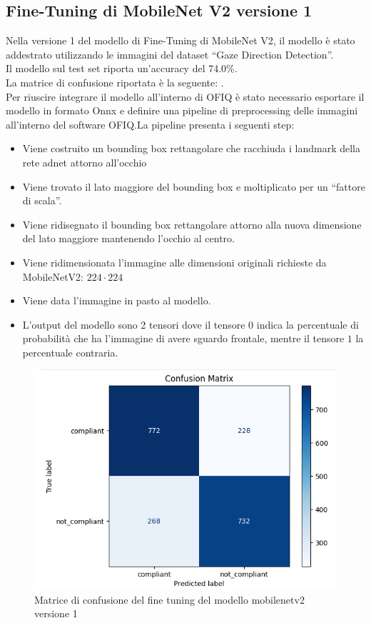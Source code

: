 \documentclass[12pt,a4paper,openright,twoside]{book}
\begin{document}
\subsection{Fine-Tuning di MobileNet V2 versione 1}
\label{chap:mobilenetv2_ft_v1}
Nella versione 1 del modello di Fine-Tuning di MobileNet V2, il modello è stato addestrato utilizzando le immagini del dataset ``Gaze Direction Detection''. \\
Il modello sul test set riporta un'accuracy del 74.0\%. \\
La matrice di confusione riportata è la seguente: . \\
Per riuscire integrare il modello all'interno di OFIQ è stato necessario esportare il modello in formato Onnx e definire una pipeline di preprocessing delle immagini all'interno del software OFIQ.La pipeline presenta i seguenti step: \begin{itemize}
    \item Viene costruito un bounding box rettangolare che racchiuda i landmark della rete adnet attorno all'occhio
    \item Viene trovato il lato maggiore del bounding box e moltiplicato per un ``fattore di scala''.
    \item Viene ridisegnato il bounding box rettangolare attorno alla nuova dimensione del lato maggiore mantenendo l'occhio al centro.
    \item Viene ridimensionata l'immagine alle dimensioni originali richieste da MobileNetV2: \(224 \cdot 224\)
    \item Viene data l'immagine in pasto al modello.
    \item L'output del modello sono 2 tensori dove il tensore \(0\) indica la percentuale di probabilità che ha l'immagine di avere sguardo frontale, mentre il tensore \(1\) la percentuale contraria.
\end{itemize}

\begin{figure}
    \centering
    \includegraphics[width=.6\linewidth]{figures/fine-tuning-mobilenetv2-version-1-confusion-matrix.png}
    \caption{Matrice di confusione del fine tuning del modello mobilenetv2 versione 1}
    \label{fig:fine_tuning_mobilenetv2_version_1_confusion_matrix}
\end{figure}
\end{document}
